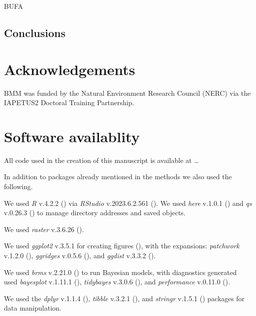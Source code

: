 \documentclass[10pt,a4paper]{article}
\begin{document}
BUFA

\subsection{Conclusions}\label{conclusions}

\section{Acknowledgements}\label{acknowledgements}

BMM was funded by the Natural Environment Research Council (NERC) via the IAPETUS2 Doctoral Training Partnership.

\section{Software availablity}\label{software-availablity}

All code used in the creation of this manuscript is available at \ldots{}

In addition to packages already mentioned in the methods we also used the following.

We used \emph{R} v.4.2.2 () via \emph{RStudio} v.2023.6.2.561 ().
We used \emph{here} v.1.0.1 () and \emph{qs} v.0.26.3 () to manage directory addresses and saved objects.

We used \emph{raster} v.3.6.26 ().

We used \emph{ggplot2} v.3.5.1 for creating figures (), with the expansions: \emph{patchwork} v.1.2.0 (), \emph{ggridges} v.0.5.6 (), and \emph{ggdist} v.3.3.2 ().

We used \emph{brms} v.2.21.0 () to run Bayesian models, with diagnostics generated used \emph{bayesplot} v.1.11.1 (), \emph{tidybayes} v.3.0.6 (), and \emph{performance} v.0.11.0 ().

We used the \emph{dplyr} v.1.1.4 (), \emph{tibble} v.3.2.1 (),
and \emph{stringr} v.1.5.1 () packages for data manipulation.
\end{document}
